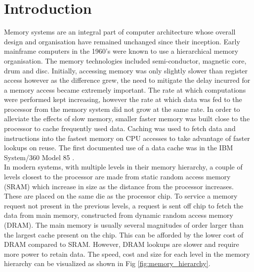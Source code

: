 
%
%

\chapter{Introduction}
\label{introduction}

Memory systems are an integral part of computer architecture whose overall design and organisation have remained unchanged since their inception. Early mainframe computers in the 1960's were known to use a hierarchical memory organisation. The memory technologies included semi-conductor, magnetic core, drum and disc. Initially, accessing memory was only slightly slower than register access however as the difference grew, the need to mitigate the delay incurred for a memory access became extremely important. The rate at which computations were performed kept increasing, however the rate at which data was fed to the processor from the memory system did not grow at the same rate. In order to alleviate the effects of slow memory, smaller faster memory was built close to the processor to cache frequently used data. Caching was used to fetch data and instructions into the fastest memory on CPU accesses to take advantage of faster lookups on reuse. The first documented use of a data cache was in the IBM System/360 Model 85 \cite{liptay68}. \\

In modern systems, with multiple levels in their memory hierarchy, a couple of levels closest to the processor are made from static random access memory (SRAM) which increase in size as the distance from the processor increases. These are placed on the same die as the processor chip. To service a memory request not present in the previous levels, a request is sent off chip to fetch the data from main memory, constructed from dynamic random access memory (DRAM). The main memory is usually several magnitudes of order larger than the largest cache present on the chip. This can be afforded by the lower cost of DRAM compared to SRAM. However, DRAM lookups are slower and require more power to retain data. The speed, cost and size for each level in the memory hierarchy can be visualized as shown in Fig \ref{fig:memory_hierarchy}.

